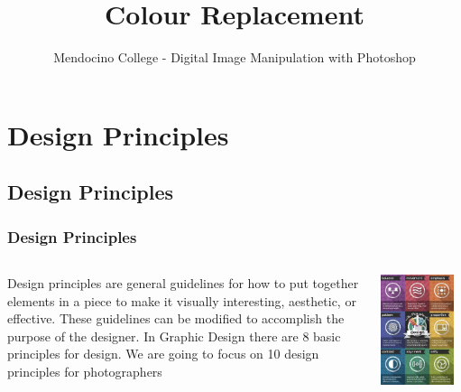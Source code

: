 \documentclass{beamer}
\title{Colour Replacement}
\author{Mendocino College - Digital Image Manipulation with Photoshop}
\date{\vspace{-5em}}
\begin{document}
	{
		\begin{frame}
			\vspace{-35pt}
			\maketitle
		\end{frame}
	}

		\section{Design Principles}
			\subsection{Design Principles}		
			\begin{frame}
				\frametitle{Design Principles}
				\begin{columns}
					\column{.6\textwidth}
					\vspace{-25pt}
					\begin{outline}
						\1 Design principles are general guidelines for how to put together elements in a piece to make it visually interesting, aesthetic, or effective. These guidelines can be modified to accomplish the purpose of the designer.
						\1 In Graphic Design there are 8 basic principles for design.
						\1 We are going to focus on 10 design principles for photographers
					\end{outline}
					\column{.45\textwidth}
					\includegraphics[width=0.9\textwidth]{images/principles of design.jpeg}

\end{columns}
\end{frame}
\end{document}

